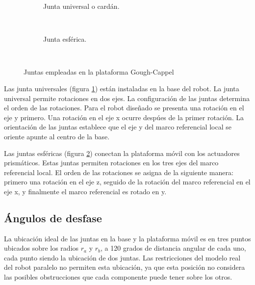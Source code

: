 \begin{figure}[htb!]
 \centering
    \begin{subfigure}[b]{0.4\textwidth}
        \caption{Junta universal o cardán.}
        \label{fig: junta universal}
    \end{subfigure}
    
    ~ %
    \begin{subfigure}[b]{0.4\textwidth}
        \caption{Junta esférica.}
        \label{fig: junta esferica}
    \end{subfigure}
    ~ %
    \caption{Juntas empleadas en la plataforma Gough-Cappel}\label{fig: joints}
\end{figure}

Las junta universales (figura \ref{fig: junta universal}) están
instaladas en la base del robot. 
La junta universal permite rotaciones en dos ejes.
La configuración de las juntas determina el orden de las rotaciones.
Para el robot diseñado se presenta una rotación en el eje y primero.
Una rotación en el eje x ocurre despúes de la primer rotación.
La orientación de las juntas establece que el eje y 
del marco referencial local se oriente apunte al centro de la base.

Las juntas esféricas (figura \ref{fig: junta esferica}) conectan la 
plataforma móvil con los actuadores prismáticos.
Estas juntas permiten rotaciones en los tres ejes del marco referencial
local.
El orden de las rotaciones se asigna de la siguiente manera:
primero una rotación en el eje z, seguido de la rotación del 
marco referencial en el eje x, y finalmente el marco 
referencial es rotado en y.

\subsection{Ángulos de desfase}

La ubicación ideal de las juntas en la base y la plataforma móvil 
es en tres puntos ubicados sobre los radios $r_a$ y $r_b$, 
a 120 grados de distancia angular de cada uno, 
cada punto siendo la ubicación de dos juntas.
Las restricciones del modelo real del robot paralelo no permiten esta
ubicación, ya que esta posición no considera las posibles obstrucciones
que cada componente puede tener sobre los otros.\\

